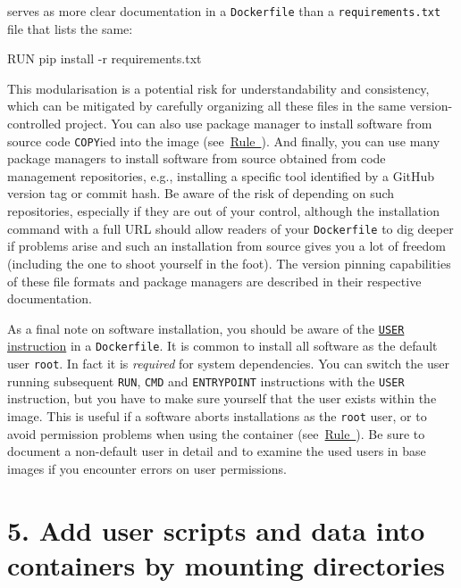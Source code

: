 \documentclass[10pt,letterpaper]{article}
\newenvironment{Shaded}{\begin{snugshade}}{\end{snugshade}}
\newcommand{\ExtensionTok}[1]{#1}
\newcommand{\NormalTok}[1]{#1}
\begin{document}
serves as more clear documentation in a \texttt{Dockerfile} than a
\texttt{requirements.txt} file that lists the same:

\begin{Shaded}
\begin{Highlighting}[]
\ExtensionTok{RUN}\NormalTok{ pip install -r requirements.txt}
\end{Highlighting}
\end{Shaded}

This modularisation is a potential risk for understandability and
consistency, which can be mitigated by carefully organizing all these
files in the same version-controlled project. You can also use package
manager to install software from source code \texttt{COPY}ied into the
image (see~\hyperref[{rule:mount}]{Rule~}). And
finally, you can use many package managers to install software from
source obtained from code management repositories, e.g., installing a
specific tool identified by a GitHub version tag or commit hash. Be
aware of the risk of depending on such repositories, especially if they
are out of your control, although the installation command with a full
URL should allow readers of your \texttt{Dockerfile} to dig deeper if
problems arise and such an installation from source gives you a lot of
freedom (including the one to shoot yourself in the foot). The version
pinning capabilities of these file formats and package managers are
described in their respective documentation.

As a final note on software installation, you should be aware of the
\href{https://docs.docker.com/engine/reference/builder/\#user}{\texttt{USER}
instruction} in a \texttt{Dockerfile}. It is common to install all
software as the default user \texttt{root}. In fact it is
\emph{required} for system dependencies. You can switch the user running
subsequent \texttt{RUN}, \texttt{CMD} and \texttt{ENTRYPOINT}
instructions with the \texttt{USER} instruction, but you have to make
sure yourself that the user exists within the image. This is useful if a
software aborts installations as the \texttt{root} user, or to avoid
permission problems when using the container
(see~\hyperref[{rule:mount}]{Rule~}). Be sure to
document a non-default user in detail and to examine the used users in
base images if you encounter errors on user permissions.

\hypertarget{add-user-scripts-and-data-into-containers-by-mounting-directories}{%
\section*{5. Add user scripts and data into containers by mounting
directories}\label{add-user-scripts-and-data-into-containers-by-mounting-directories}}
\end{document}
